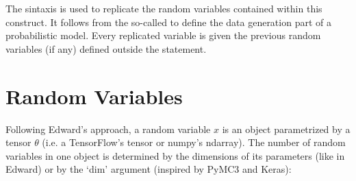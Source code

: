 \documentclass[letterpaper,10pt,english]{sphinxmanual}
\begin{document}
\begin{sphinxVerbatim}[commandchars=\\\{\}]
   
   
   

      

   
     
            

     
            
             



\end{sphinxVerbatim}

The  sintaxis is used to replicate the
random variables contained within this construct. It follows from the
so-called  to define the data generation part of a
probabilistic model. Every replicated variable is  given the previous random variables (if any) defined
outside the  statement.


\section{Random Variables}
\label{\detokenize{notes/guidemodels:random-variables}}
Following Edward’s approach, a random variable \(x\) is an object
parametrized by a tensor \(\theta\) (i.e. a TensorFlow’s tensor or
numpy’s ndarray). The number of random variables in one object is
determined by the dimensions of its parameters (like in Edward) or by
the ‘dim’ argument (inspired by PyMC3 and Keras):
\end{document}

